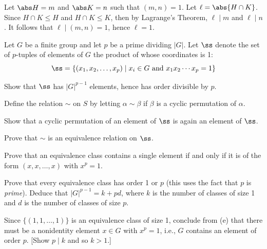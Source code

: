 \begin{sol}
    Let $\abs H = m$ and $\abs K = n$ such that $(m, n) = 1$. Let $\ell = \abs{H \cap K}$. Since $H \cap K \leq H$ and $H \cap K \leq K$, then by Lagrange's Theorem, $\ell \mid m$ and $\ell \mid n$. It follows that $\ell \mid (m, n) = 1$, hence $\ell = 1$.
\end{sol}

\begin{specialexercise}\label{ex3.2.9}
    Let $G$ be a finite group and let $p$ be a prime dividing $|G|$. Let $\ss$ denote the set of $p$-tuples of elements of $G$ the product of whose coordinates is 1:
    \[\ss = \{(x_1, x_2, \ldots, x_p) \mid x_i \in G \text{ and } x_1x_2 \cdots x_p = 1\}\]
    \begin{subproblems}
        \item Show that $\ss$ has $|G|^{p-1}$ elements, hence has order divisible by $p$.
    \end{subproblems}
    Define the relation $\sim$ on $S$ by letting $\alpha \sim \beta$ if $\beta$ is a cyclic permutation of $\alpha$.
    \begin{subproblems}[resume]
        \item Show that a cyclic permutation of an element of $\ss$ is again an element of $\ss$.
        \item Prove that $\sim$ is an equivalence relation on $\ss$.
        \item Prove that an equivalence class contains a single element if and only if it is of the form $(x, x, \dots, x)$ with $x^p = 1$.
        \item Prove that every equivalence class has order 1 or $p$ (this uses the fact that $p$ is \emph{prime}). Deduce that $|G|^{p-1} = k + pd$, where $k$ is the number of classes of size 1 and $d$ is the number of classes of size $p$.
        \item Since $\{(1, 1, \dots, 1)\}$ is an equivalence class of size 1, conclude from (e) that there must be a nonidentity element $x \in G$ with $x^p = 1$, i.e., $G$ contains an element of order $p$. [Show $p \mid k$ and so $k > 1$.]
    \end{subproblems}
\end{specialexercise}

